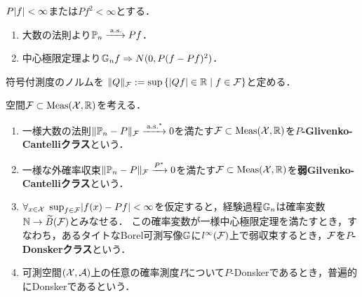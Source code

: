 \documentclass[uplatex,dvipdfmx]{jsreport}
\begin{document}
\begin{proposition}\label{prop-large-number-theorem-to-empirical-process}
    $P\lvert f\rvert<\infty$または$Pf^2<\infty$とする．
    \begin{enumerate}
        \item 大数の法則より$\mathbb{P}_n\xrightarrow{\;\mathrm{a.s.}} Pf$．
        \item 中心極限定理より$\mathbb{G}_nf\Rightarrow N(0,P(f-Pf)^2)$．
    \end{enumerate}
\end{proposition}

\begin{notation}
    符号付測度のノルムを
    $\|Q\|_{\mathcal{F}}:=\sup\left\{\lvert Qf\rvert\in\mathbb{R}\mid f\in\mathcal{F}\right\}$と定める．
\end{notation}

\begin{definition}
    空間$\mathcal{F}\subset\mathrm{Meas}(\mathcal{X},\mathbb{R})$を考える．
    \begin{enumerate}
        \item 一様大数の法則$\|\mathbb{P}_n-P\|_{\mathcal{F}}\xrightarrow{\;\mathrm{a.s.}^*}0$を満たす$\mathcal{F}\subset\mathrm{Meas}(\mathcal{X},\mathbb{R})$を\textbf{$P$-Glivenko-Cantelliクラス}という．
        \item 一様な外確率収束$\|\mathbb{P}_n-P\|_{\mathcal{F}}\xrightarrow{P^*}0$を満たす$\mathcal{F}\subset\mathrm{Meas}(\mathcal{X},\mathbb{R})$を\textbf{弱Gilvenko-Cantelliクラス}という．
        \item $\forall_{x\in\mathcal{X}}\;\sup_{f\in\mathcal{F}}\lvert f(x)-Pf\rvert<\infty$を仮定すると，経験過程$\mathbb{G}_n$は確率変数$\mathbb{N}\to\widetilde{B}(\mathcal{F})$とみなせる．
        この確率変数が一様中心極限定理を満たすとき，すなわち，あるタイトなBorel可測写像$\mathbb{G}$に$l^\infty(\mathcal{F})$上で弱収束するとき，$\mathcal{F}$を\textbf{$P$-Donskerクラス}という．
        \item 可測空間$(\mathcal{X},\mathcal{A})$上の任意の確率測度$P$について$P$-Donskerであるとき，普遍的にDonskerであるという．
    \end{enumerate}
\end{definition}
\end{document}
